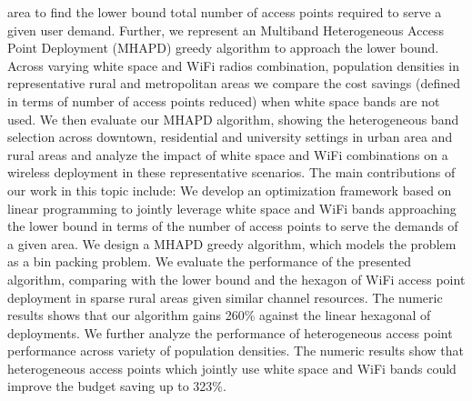area to find the lower bound total number of access points required to 
serve a given user demand. Further, we represent an Multiband Heterogeneous 
Access Point Deployment (MHAPD) greedy algorithm 
to approach the lower bound. Across varying white space and WiFi radios 
combination, population densities in representative rural and metropolitan 
areas we compare the cost savings (defined in terms of number of access 
points reduced) when white space bands are not used. We then evaluate our 
MHAPD algorithm, showing the heterogeneous band selection across downtown, 
residential and university settings in urban area and rural areas and analyze 
the impact of white space and WiFi combinations on a wireless deployment in 
these representative scenarios.
The main contributions of our work in this topic include: We develop an 
optimization framework based on linear programming to jointly leverage 
white space and WiFi bands approaching the lower bound in terms of the number 
of access points to serve the demands of a given area. We design a MHAPD 
greedy algorithm, which models the problem as a bin packing problem. We 
evaluate the performance of the presented algorithm, comparing with the 
lower bound and the hexagon of WiFi access point deployment in sparse rural 
areas given similar channel resources. The numeric results shows that our 
algorithm gains 260\% against the linear hexagonal of deployments.  We 
further analyze the performance of heterogeneous access point performance 
across variety of population densities. The numeric results show that heterogeneous 
access points which jointly use white space and WiFi bands could improve 
the budget saving up to 323\%. 

